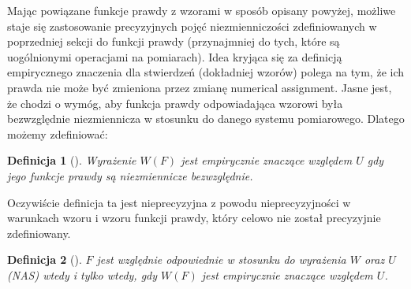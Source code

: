 \documentclass[12pt,a4paper]{report}
\newtheorem{definition}{Definicja}[chapter]
\begin{document}
Mając powiązane funkcje prawdy z wzorami w sposób opisany powyżej, możliwe staje się zastosowanie precyzyjnych pojęć niezmienniczości zdefiniowanych w poprzedniej sekcji do funkcji prawdy (przynajmniej do tych, które są uogólnionymi operacjami na pomiarach). Idea kryjąca się za definicją empirycznego znaczenia dla stwierdzeń (dokładniej wzorów) polega na tym, że ich prawda nie może być zmieniona przez zmianę numerical assignment. Jasne jest, że chodzi o wymóg, aby funkcja prawdy odpowiadająca wzorowi była bezwzględnie niezmiennicza w stosunku do danego systemu pomiarowego. Dlatego możemy zdefiniować:
\begin{definition}[{\citep[Def. 7]{adams1965theory}}]
Wyrażenie $W(F)$ jest empirycznie znaczące względem $U$ gdy jego funkcje prawdy są niezmiennicze bezwzględnie.
\end{definition}
Oczywiście definicja ta jest nieprecyzyjna z powodu nieprecyzyjności w warunkach wzoru i wzoru funkcji prawdy, który celowo nie został precyzyjnie zdefiniowany. 
\begin{definition}[{\citep[Def. 8]{adams1965theory}}]
$F$ jest względnie odpowiednie w stosunku do wyrażenia $W$ oraz $U$ (NAS) wtedy i tylko wtedy, gdy $W(F)$ jest empirycznie znaczące względem $U$.
\end{definition}
\end{document}
